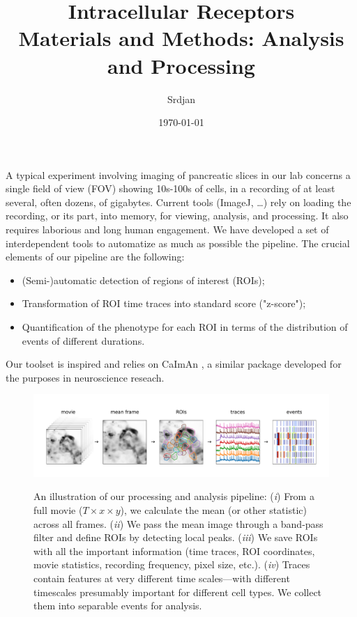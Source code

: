 \documentclass[a4paper,11pt,final]{article}
\title{Intracellular Receptors \\ {\small Materials and Methods: Analysis and Processing}}
\author{Srdjan}
\date{\today}
\begin{document}
\maketitle


A typical experiment involving imaging of pancreatic slices in our lab concerns a single field of view (FOV)
showing 10s-100s of cells, in a recording of at least several, often dozens, of gigabytes.
Current tools (ImageJ, \dots) rely on loading the recording, or its part, into memory, for viewing, analysis, and processing.
It also requires laborious and long human engagement.
We have developed a set of interdependent tools to automatize as much as possible the pipeline. 
The crucial elements of our pipeline are the following:
\begin{itemize}
\item (Semi-)automatic detection of regions of interest (ROIs);
\item Transformation of ROI time traces into standard score ("z-score");
\item Quantification of the phenotype for each ROI in terms of the distribution of events of different durations.
\end{itemize}

Our toolset is inspired and relies on CaImAn \cite{giovannucci2019caiman}, a similar package developed for the purposes in neuroscience reseach.

\begin{figure}[h]
\centering
\includegraphics[width=17cm,trim=1.5cm 1.5cm 1cm 1.5cm,clip]{figures/pipeline.pdf}
\label{fig:pipeline}
\caption{
An illustration of our processing and analysis pipeline:
({\it i})  From a full movie ($T{\times}x{\times}y$), we calculate the mean (or other statistic) across all frames.
({\it ii}) We pass the mean image through a band-pass filter and define ROIs by detecting local peaks.
({\it iii}) We save ROIs with all the important information (time traces, ROI coordinates, movie statistics, recording frequency, pixel size, etc.).
({\it iv}) Traces contain features at very different time scales---with different timescales presumably important for different cell types. We collect them into separable events for analysis.
}
\end{figure}
\end{document}
